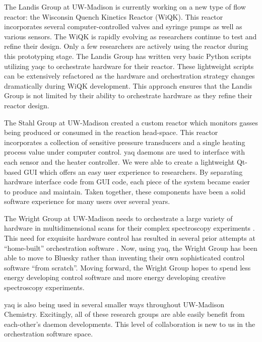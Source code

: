 \documentclass[aip, amsmath, amssymb, reprint,]{revtex4-1}
\begin{document}
The Landis Group at UW-Madison is currently working on a new type of flow reactor: the Wisconsin Quench Kinetics Reactor (WiQK).
This reactor incorporates several computer-controlled valves and syringe pumps as well as various sensors.
The WiQK is rapidly evolving as researchers continue to test and refine their design.
Only a few researchers are actively using the reactor during this prototyping stage.
The Landis Group has written very basic Python scripts utilizing yaqc to orchestrate hardware for their reactor.
These lightweight scripts can be extensively refactored as the hardware and orchestration strategy changes dramatically during WiQK development.
This approach ensures that the Landis Group is not limited by their ability to orchestrate hardware as they refine their reactor design.

The Stahl Group at UW-Madison created a custom reactor which monitors gasses being produced or consumed in the reaction head-space.  \cite{SalazarChaseA2021a}
This reactor incorporates a collection of sensitive pressure transducers and a single heating process value under computer control.
yaq daemons are used to interface with each sensor and the heater controller.
We were able to create a lightweight Qt-based GUI which offers an easy user experience to researchers.
By separating hardware interface code from GUI code, each piece of the system became easier to produce and maintain.
Taken together, these components have been a solid software experience for many users over several years.

The Wright Group at UW-Madison needs to orchestrate a large variety of hardware in multidimensional scans for their complex spectroscopy experiments \cite{MukamelShaul2000a, WrightJohnCurtis2011a}.
This need for exquisite hardware control has resulted in several prior attempts at ``home-built'' orchestration software \cite{CarlsonRogerJohn1988a, MeyerKentAlbert2004b, KainSchuyler2017a, ThompsonBlaiseJonathan2018a}.
Now, using yaq, the Wright Group has been able to move to Bluesky rather than inventing their own sophisticated control software ``from scratch''.
Moving forward, the Wright Group hopes to spend less energy developing control software and more energy developing creative spectroscopy experiments.

yaq is also being used in several smaller ways throughout UW-Madison Chemistry.
Excitingly, all of these research groups are able easily benefit from each-other's daemon developments.
This level of collaboration is new to us in the orchestration software space.
\end{document}
